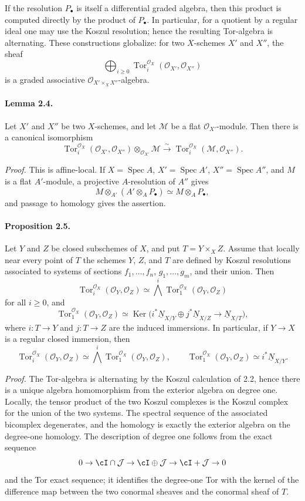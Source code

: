 \documentclass[11pt]{article}
\theoremstyle{plain}
\theoremstyle{definition}
\theoremstyle{remark}
\newcommand{\cJ}{\mathcal J}\newcommand{\cK}{\mathcal K}\newcommand{\cL}{\mathcal L}
\newcommand{\cM}{\mathcal M}\newcommand{\cN}{\mathcal N}\newcommand{\cO}{\mathcal O}
\DeclareMathOperator{\Spec}{Spec}
\DeclareMathOperator{\Tor}{Tor}
\DeclareMathOperator{\Ker}{Ker}
\providecommand{\iso}{\xrightarrow{\sim}}
\begin{document}
If the resolution $P_\bullet$ is itself a differential graded algebra, then this product is computed directly by the product of $P_\bullet$. In particular, for a quotient by a regular ideal one may use the Koszul resolution; hence the resulting Tor-algebra is alternating. These constructions globalize: for two $X$-schemes $X'$ and $X''$, the sheaf
\[
\bigoplus_{i\geq0}\Tor_i^{\cO_X}(\cO_{X'},\cO_{X''})
\]
is a graded associative $\cO_{X'\times_X X''}$-algebra.

\paragraph{Lemma 2.4.} Let $X'$ and $X''$ be two $X$-schemes, and let $\cM$ be a flat $\cO_{X'}$-module. Then there is a canonical isomorphism
\[
\Tor_i^{\cO_X}(\cO_{X'},\cO_{X''})\otimes_{\cO_{X'}}\cM\iso \Tor_i^{\cO_X}(\cM,\cO_{X''}).
\]

\emph{Proof.} This is affine-local. If $X=\Spec A$, $X'=\Spec A'$, $X''=\Spec A''$, and $M$ is a flat $A'$-module, a projective $A$-resolution of $A''$ gives
\[
M\otimes_{A'}(A'\otimes_AP_\bullet)\simeq M\otimes_AP_\bullet,
\]
and passage to homology gives the assertion.

\paragraph{Proposition 2.5.} Let $Y$ and $Z$ be closed subschemes of $X$, and put $T=Y\times_X Z$. Assume that locally near every point of $T$ the schemes $Y$, $Z$, and $T$ are defined by Koszul resolutions associated to systems of sections $f_1,\ldots,f_n$, $g_1,\ldots,g_m$, and their union. Then
\[
\Tor_i^{\cO_X}(\cO_Y,\cO_Z)\simeq \bigwedge^i\Tor_1^{\cO_X}(\cO_Y,\cO_Z)
\]
for all $i\geq0$, and
\[
\Tor_1^{\cO_X}(\cO_Y,\cO_Z)
\simeq \Ker\bigl(i^*\underline N_{X/Y}\oplus j^*\underline N_{X/Z}\to\underline N_{X/T}\bigr),
\]
where $i:T\to Y$ and $j:T\to Z$ are the induced immersions. In particular, if $Y\to X$ is a regular closed immersion, then
\[
\Tor_i^{\cO_X}(\cO_Y,\cO_Z)\simeq \bigwedge^i\Tor_1^{\cO_X}(\cO_Y,\cO_Z),
\qquad
\Tor_1^{\cO_X}(\cO_Y,\cO_Z)\simeq i^*\underline N_{X/Y}.
\]

\emph{Proof.} The Tor-algebra is alternating by the Koszul calculation of 2.2, hence there is a unique algebra homomorphism from the exterior algebra on degree one. Locally, the tensor product of the two Koszul complexes is the Koszul complex for the union of the two systems. The spectral sequence of the associated bicomplex degenerates, and the homology is exactly the exterior algebra on the degree-one homology. The description of degree one follows from the exact sequence
\[
0\to\cI\cap\cJ\to\cI\oplus\cJ\to\cI+\cJ\to0
\]
and the Tor exact sequence; it identifies the degree-one Tor with the kernel of the difference map between the two conormal sheaves and the conormal sheaf of $T$.
\end{document}
